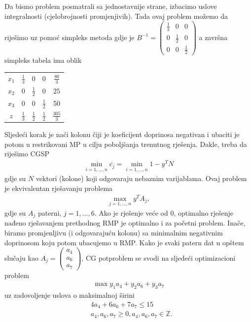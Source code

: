 \documentclass[a4paper, utf8, 11pt, colorlinks]{book}
\theoremstyle{definition}
\begin{document}
Da bismo  problem posmatrali sa jednostavnije strane, izbacimo uslove integralnosti (cjelobrojnosti promjenjivih). Tada ovaj problem možemo da riješimo uz pomoć simpleks metoda gdje je 
$B^{-1} =\begin{pmatrix}
	    \frac{1}{3} & 0 & 0 \\
	    0 & \frac{1}{2} & 0  \\
	    0 &   0 & \frac{1}{2}
\end{pmatrix}$ a završna simpleks tabela ima oblik 

\begin{center}
 
\begin{tabular}{cccc|c}
	  $x_1$ &     $\frac{1}{3}$  &   0 & 0  & $\frac{80}{3}$ \\
	  $x_2$ &     0              &  $\frac{1}{2}$  & 0 & $25$ \\
	  $x_3$ &     0              &  0    &  $\frac{1}{2}$  & 50 \\ \hline
	  $z$   &  $\frac{1}{3}$     &  $\frac{1}{2}$   &  $\frac{1}{2}$ & $\frac{305}{3}$ 
\end{tabular}
\end{center}
Sljedeći korak je naći kolonu čiji je koeficijent doprinosa negativan i ubaciti je potom u restrikovani MP u cilju poboljšanja trenutnog rješenja. Dakle, treba da riješimo CGSP
\begin{align}
	\min_{i=1,\ldots,n} \overline{c_j} = \min_{i=1,\ldots,n} 1 - y^T N
\end{align}
gdje su $N$ vektori (kolone) koji odgovaraju nebaznim varijablama. Ovaj problem je ekvivalentan rješavanju problema
\begin{align}
	\max_{j=1,\ldots,n} y^T A_j,
\end{align}
gdje su $A_j$ paterni, $j=1,\ldots, 6$. 
Ako je rješenje veće od 0, optimalno rješenje nađeno rješavanjem prethodnog RMP je optimalno i za početni problem. Inače, biramo promjenljivu (i odgovarajuću kolonu) sa minimalnim negativnim doprinosom koju potom ubacujemo u RMP. Kako je svaki patern dat u opštem slučaju kao $A_j = \begin{pmatrix}
	a_4 \\
	a_6 \\
	a_7
\end{pmatrix}$, CG potproblem se svodi na sljedeći optimizacioni problem
\begin{align}
	 \max y_1 a_4 + y_2 a_6 + y_3 a_7  
\end{align}
uz zadovoljenje uslova o maksimalnoj širini
\begin{align}
   &	4 a_4 + 6 a_6 + 7 a_7 \leq 15 \\
   &	a_4, a_6, a_7 \geq 0, a_4, a_6, a_7 \in \mathbb{Z}.
\end{align}
\end{document}
